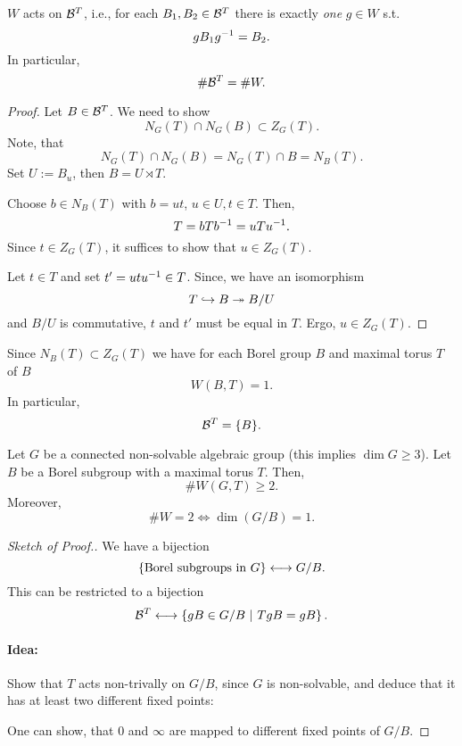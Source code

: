 \begin{theorem}
	$W$ acts  on $\mathcal{B}^T$, i.e., for each $B_1, B_2 \in \mathcal{B}^T$ there is exactly \emph{one} $g \in W$ s.t.
	\[ gB_1g^{-1} = B_2. \]
	In particular,
	\[ \#\mathcal{B}^T = \# W. \]
\end{theorem}
\begin{proof}
	Let $B \in \mathcal{B}^T$. We need to show
	\[ N_G(T) \cap N_G(B) \subset Z_G(T). \]
	Note, that
	\[ N_G(T) \cap N_G(B) = N_G(T) \cap B = N_B(T). \]
	Set $U := B_u$, then $B = U \rtimes T$.
	
	Choose $b \in N_B(T)$ with $b = ut$, $u\in U, t \in T$. Then,
	\[ T = bTb^{-1} = uTu^{-1}. \]
	Since $t \in Z_G(T)$, it suffices to show that $u \in Z_G(T)$.
	
	Let $t \in T$ and set $t' = utu^{-1} \in T$. Since, we have an isomorphism
	\[ T \overset{}{\hookrightarrow} B \overset{}{\twoheadrightarrow} B/U \]
	and $B/U$ is commutative, $t$ and $t'$ must be equal in $T$. Ergo, $u \in Z_G(T)$.
\end{proof}

\begin{corollary}
	Since $N_B(T) \subset Z_G(T)$ we have for each Borel group $B$ and maximal torus $T$ of $B$
	\[ W(B,T) = 1. \]
	In particular,
	\[\mathcal{B}^T = \{B\}. \]
\end{corollary}

\begin{proposition}
Let $G$ be a connected non-solvable algebraic group (this implies $\dim G \geq 3$). Let $B$ be a Borel subgroup with a maximal torus $T$. Then,
\[\# W(G,T) \geq 2. \]
Moreover,
\[\# W = 2 \iff \dim(G / B) = 1. \]
\end{proposition}
\begin{proof}[Sketch of Proof.]
	We have a bijection
	\[ \left\lbrace\text{Borel subgroups in }G\right\rbrace \longleftrightarrow G / B. \]
	This can be restricted to a bijection
	\[ \mathcal{B}^T \longleftrightarrow \left\lbrace gB \in G/B ~ | ~ TgB = gB\right\rbrace. \]
	\paragraph{Idea:} Show that $T$ acts non-trivally on $G/B$, since $G$ is non-solvable, and deduce that it has at least two different fixed points:
	\begin{center}
	\end{center}
One can show, that $0$ and $\infty$ are mapped to different fixed points of $G/B$.
\end{proof}
